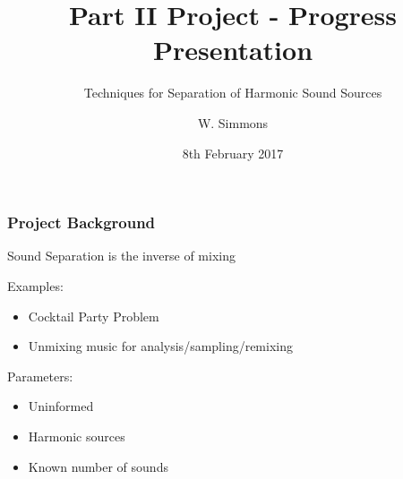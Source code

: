 \documentclass{beamer}
\title{Part II Project - Progress Presentation}
\subtitle{Techniques for Separation of Harmonic Sound Sources}
\author[Will]{W. Simmons}
\date[08/02/2017]{8th February 2017}
\begin{document}
\frame{\titlepage}

%
%
%


\begin{frame}

\frametitle{Project Background}

Sound Separation is the inverse of mixing

\bigskip
\pause

Examples:

\begin{itemize}
\item Cocktail Party Problem

\item Unmixing music for analysis/sampling/remixing
\end{itemize}

\bigskip
\pause

Parameters:

\begin{itemize}
\item Uninformed

\item Harmonic sources

\item Known number of sounds
\end{itemize}

\end{frame}
\end{document}
